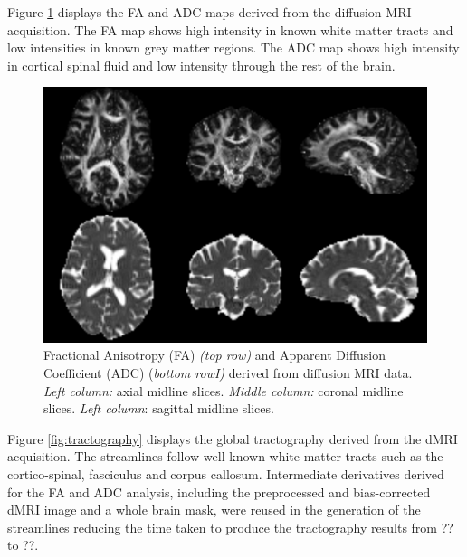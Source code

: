 Figure \ref{fig:fa_adc}  displays the FA and ADC maps derived from the diffusion MRI
acquisition. The FA map shows high intensity in known white matter
tracts and low intensities in known grey matter regions. The ADC map
shows high intensity in cortical spinal fluid and low intensity through
the rest of the brain.



\begin{figure}
  \begin{center}
    \includegraphics[width=\textwidth]{figures/fa_adc}
  \caption{Fractional Anisotropy (FA) \emph{(top row)} and
Apparent Diffusion Coefficient (ADC) (\emph{bottom rowI)} derived from
diffusion MRI data. \emph{Left column:} axial midline slices.
\emph{Middle column:} coronal midline slices. \emph{Left column}:
sagittal midline slices.}
  \end{center}
\label{fig:fa_adc}
\end{figure}

Figure \ref{fig:tractography} displays the global tractography derived from the dMRI
acquisition. The streamlines follow well known white matter tracts such
as the cortico-spinal, fasciculus and corpus callosum. Intermediate
derivatives derived for the FA and ADC analysis, including the
preprocessed and bias-corrected dMRI image and a whole brain mask, were
reused in the generation of the streamlines reducing the time taken to
produce the tractography results from ?? to ??.


